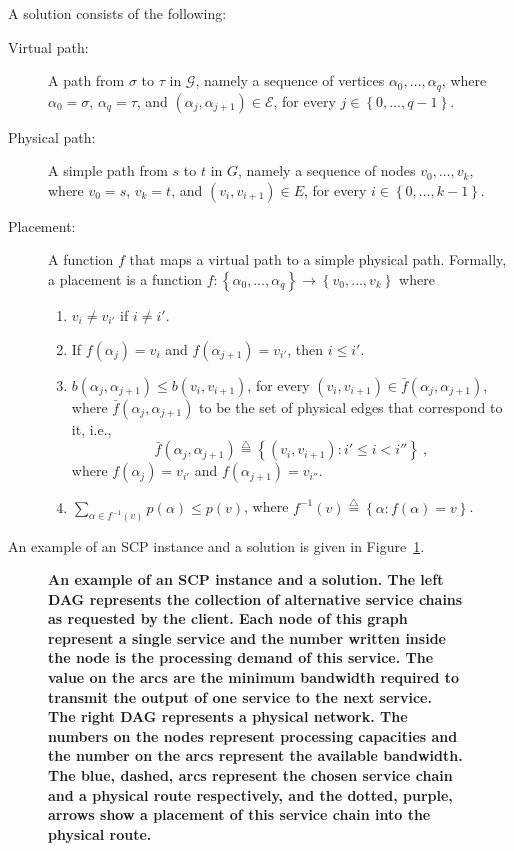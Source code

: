\documentclass[11pt]{article}
\newcommand{\fix}[1]{{\color{purple}\textbf{#1}}}
\newcommand{\eqdf}{\stackrel{\scriptscriptstyle \triangle}{=}}
\newcommand{\set}[1]{\left\{ #1 \right\}}
\newcommand{\scp}{\textsc{SCP}\xspace}
\newcommand{\calE}{\mathcal{E}}
\newcommand{\calG}{\mathcal{G}}
\begin{document}
A solution consists of the following:
\begin{description}
\item[Virtual path:] A path from $\sigma$ to $\tau$ in $\calG$, namely
  a sequence of vertices $\alpha_0,\ldots,\alpha_q$, where
  $\alpha_0 = \sigma$, $\alpha_q = \tau$, and
  $(\alpha_j,\alpha_{j+1}) \in \calE$, for every $j \in
  \set{0,\ldots,q-1}$.

\medskip
  
\item[Physical path:] A simple path from $s$ to $t$ in $G$, namely a
  sequence of nodes $v_0,\ldots,v_k$, where $v_0 = s$, $v_k = t$, and
  $(v_i,v_{i+1}) \in E$, for every $i \in \set{0,\ldots,k-1}$.

\medskip
  
\item[Placement:] A function $f$ that maps a virtual path to a simple
  physical path.  Formally, a placement is a function $f:
  \set{\alpha_0,\ldots,\alpha_q} \to \set{v_0,\ldots,v_k}$ where 
\begin{enumerate}
\item $v_i \neq v_{i'}$ if $i \neq i'$.    
\item If $f(\alpha_j) = v_i$ and $f(\alpha_{j+1}) = v_{i'}$, then $i
  \leq i'$.
\item $b(\alpha_j,\alpha_{j+1}) \leq b(v_i,v_{i+1})$, for every
  $(v_i,v_{i+1}) \in \bar{f}(\alpha_j,\alpha_{j+1})$, where
  $\bar{f}(\alpha_j,\alpha_{j+1})$ to be the set of physical edges
  that correspond to it, i.e.,
\[
\bar{f}(\alpha_j,\alpha_{j+1}) \eqdf \set{(v_i,v_{i+1}) : i' \leq i < i''}
~,
\]
  where $f(\alpha_j) = v_{i'}$ and $f(\alpha_{j+1}) = v_{i''}$.

\item $\sum_{\alpha \in f^{-1}(v)} p(\alpha) \leq p(v)$, where
  $f^{-1}(v) \eqdf \set{\alpha : f(\alpha) = v}$.
 
\end{enumerate}
\end{description}

An example of an \scp instance and a solution is given in
Figure~\ref{fig:solution}.

\begin{figure}[t]
\centering
\scalebox{0.9}{

}
\caption{\fix{
  An example of an \scp instance and a solution.
  The left DAG represents the collection of alternative service chains as requested by the client.
  Each node of this graph represent a single service and the number written inside the node is the processing demand of this service.
  The value on the arcs are the minimum bandwidth required to transmit the output of one service to the next service.
  \\
  The right DAG represents a physical network. 
  The numbers on the nodes represent processing capacities and the number on the arcs represent the available bandwidth.
  \\
  The blue, dashed, arcs represent the chosen service chain and a physical route respectively, and the dotted, purple, arrows show a placement of this service chain into the physical route.
}}
\label{fig:solution}
\end{figure}
\end{document}
